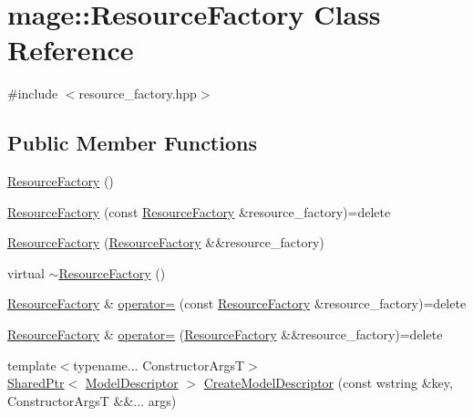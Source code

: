 \hypertarget{classmage_1_1_resource_factory}{}\section{mage\+:\+:Resource\+Factory Class Reference}
\label{classmage_1_1_resource_factory}


{\ttfamily \#include $<$resource\+\_\+factory.\+hpp$>$}

\subsection*{Public Member Functions}
\begin{DoxyCompactItemize}
\item 
\hyperlink{classmage_1_1_resource_factory_a340bde81096427e319b60063ae771a0d}{Resource\+Factory} ()
\item 
\hyperlink{classmage_1_1_resource_factory_ac2d236ed7dc16f4ab87d9d8e95d78a94}{Resource\+Factory} (const \hyperlink{classmage_1_1_resource_factory}{Resource\+Factory} \&resource\+\_\+factory)=delete
\item 
\hyperlink{classmage_1_1_resource_factory_a492a4d018530a7e5dcdb3f7a2800b252}{Resource\+Factory} (\hyperlink{classmage_1_1_resource_factory}{Resource\+Factory} \&\&resource\+\_\+factory)
\item 
virtual \hyperlink{classmage_1_1_resource_factory_a58764dea5d6cd05405bd62366cc25681}{$\sim$\+Resource\+Factory} ()
\item 
\hyperlink{classmage_1_1_resource_factory}{Resource\+Factory} \& \hyperlink{classmage_1_1_resource_factory_a1a99724dd744fde5ce2a1488966b30d0}{operator=} (const \hyperlink{classmage_1_1_resource_factory}{Resource\+Factory} \&resource\+\_\+factory)=delete
\item 
\hyperlink{classmage_1_1_resource_factory}{Resource\+Factory} \& \hyperlink{classmage_1_1_resource_factory_a4a1a0c064f068329f4b94c47ec17046f}{operator=} (\hyperlink{classmage_1_1_resource_factory}{Resource\+Factory} \&\&resource\+\_\+factory)=delete
\item 
{\footnotesize template$<$typename... Constructor\+ArgsT$>$ }\\\hyperlink{namespacemage_a1e01ae66713838a7a67d30e44c67703e}{Shared\+Ptr}$<$ \hyperlink{classmage_1_1_model_descriptor}{Model\+Descriptor} $>$ \hyperlink{classmage_1_1_resource_factory_adf4beaf799405445149a6e2e1e43b331}{Create\+Model\+Descriptor} (const wstring \&key, Constructor\+ArgsT \&\&... args)

\end{DoxyCompactItemize}
